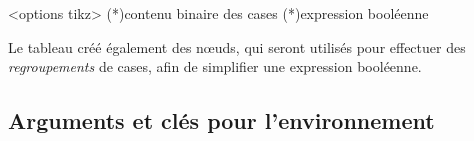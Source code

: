 \documentclass[french,a4paper,11pt]{article}
\begin{document}
{{\begin{DemoCode}
\begin{TableKarnaugh}[clés]<options tikz>
	\KarnaughCasesResult(*){contenu binaire des cases} %
	\KarnaughCasesAuto(*){expression booléenne} %
\end{TableKarnaugh}
\end{DemoCode}
%

\begin{DemoCode}[]
\begin{TableKarnaugh}[Aide]
\end{TableKarnaugh}
\hspace{0.25cm}
\begin{TableKarnaugh}[Variables=u/v/w]
\end{TableKarnaugh}
\hspace{0.25cm}
\begin{TableKarnaugh}[Variables=u/v/w,Swap]
\end{TableKarnaugh}

\begin{center}
	\begin{TableKarnaugh}[Legende=false,Unite=1.5cm,Epaisseur=1.5pt,Couleur=brown]
	\end{TableKarnaugh}
\end{center}
\end{DemoCode}

\begin{tipblock}
Le tableau créé également des nœuds, qui seront utilisés pour effectuer des \textit{regroupements} de cases, afin de simplifier une expression booléenne.
\end{tipblock}

\subsection{Arguments et clés pour l'environnement}

}}
\end{document}
